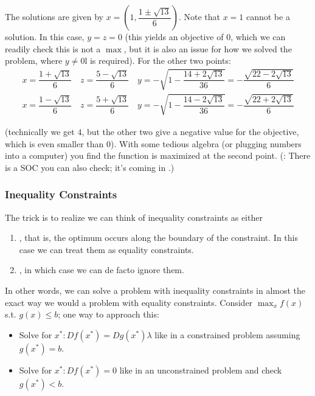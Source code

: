 \documentclass{article}
\begin{document}
\begin{example}
  The solutions are given by $x = \left(1, \dfrac{1 \pm \sqrt{13}}{6}\right)$. Note that $x = 1$ cannot be a solution. In this case, $y = z = 0$ (this yields an objective of $0$, which we can readily check this is not a $\max$, but it is also an issue for how we solved the problem, where $y \ne 0$l is required). For the other two points:
  \begin{align*}
    x = \dfrac{1 + \sqrt{13}}{6}
    \quad
    z = \dfrac{5 - \sqrt{13}}{6}
    \quad
    y
    = - \sqrt{1 - \dfrac{14 + 2 \sqrt{13}}{36}}
    = - \dfrac{\sqrt{22 - 2 \sqrt{13}}}{6}
    \\
    x = \dfrac{1 - \sqrt{13}}{6}
    \quad
    z = \dfrac{5 + \sqrt{13}}{6}
    \quad
    y
    = - \sqrt{1 - \dfrac{14 - 2 \sqrt{13}}{36}}
    = - \dfrac{\sqrt{22 + 2 \sqrt{13}}}{6}
  \end{align*}

  (technically we get $4$, but the other two give a negative value for the objective, which is even smaller than $0$). With some tedious algebra (or plugging numbers into a computer) you find the function is maximized at the second point. (\NB: There is a SOC you can also check; it's coming in .)
\end{example}

\subsubsection{Inequality Constraints}
\label{ssub:inequality_constraints}

The trick is to realize we can think of inequality constraints as either
\begin{enumerate}
  \item {}, that is, the optimum occurs along the boundary of the constraint. In this case we can treat them as equality constraints.

  \item {}, in which case we can de facto ignore them.
\end{enumerate}

In other words, we can solve a problem with inequality constraints in almost the exact way we would a problem with equality constraints. Consider $\max_x f(x)$ s.t. $g(x) \le b$; one way to approach this:
\begin{itemize}[label=$\bullet$]
  \item Solve for $x^*: D f(x^*) = D g(x^*) \lambda$ like in a constrained problem assuming $g(x^*) = b$.
  \item Solve for $x^*: D f(x^*) = 0$ like in an unconstrained problem and check $g(x^*) < b$.
\end{itemize}
\end{document}
